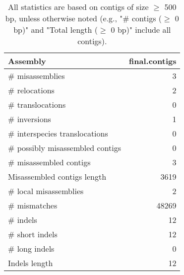 \documentclass[12pt,a4paper]{article}
\begin{document}
\begin{table}[ht]
\begin{center}
\caption{All statistics are based on contigs of size $\geq$ 500 bp, unless otherwise noted (e.g., "\# contigs ($\geq$ 0 bp)" and "Total length ($\geq$ 0 bp)" include all contigs).}
\begin{tabular}{|l*{1}{|r}|}
\hline
Assembly & final.contigs \\ \hline
\# misassemblies & 3 \\ \hline
\hspace{5mm}\# relocations & 2 \\ \hline
\hspace{5mm}\# translocations & 0 \\ \hline
\hspace{5mm}\# inversions & 1 \\ \hline
\hspace{5mm}\# interspecies translocations & 0 \\ \hline
\# possibly misassembled contigs & 0 \\ \hline
\# misassembled contigs & 3 \\ \hline
Misassembled contigs length & 3619 \\ \hline
\# local misassemblies & 2 \\ \hline
\# mismatches & 48269 \\ \hline
\# indels & 12 \\ \hline
\hspace{5mm}\# short indels & 12 \\ \hline
\hspace{5mm}\# long indels & 0 \\ \hline
Indels length & 12 \\ \hline
\end{tabular}
\end{center}
\end{table}
\end{document}
